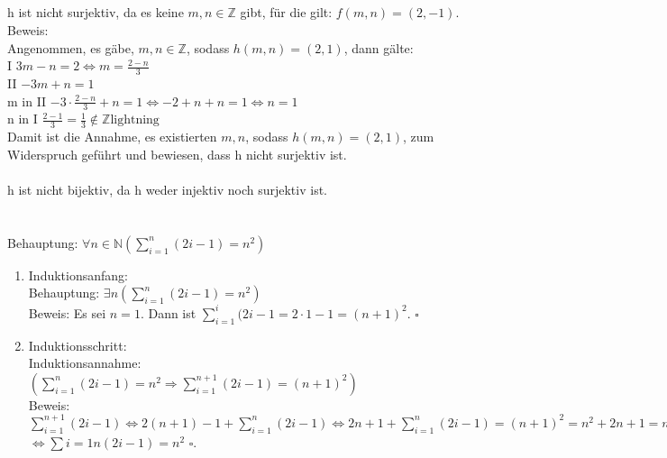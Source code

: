 \documentclass[fleqn]{article}
\newcommand{\N}{\mathbb{N}}
\newcommand{\Z}{\mathbb{Z}}
\begin{document}
\subsection{}
h ist nicht surjektiv, da es keine $m,n \in \Z$ gibt, für die gilt: $f(m,n) = (2,-1)$.\\
Beweis:\\
Angenommen, es gäbe, $m,n \in \Z$, sodass $h(m,n) = (2,1)$, dann gälte:\\
I   $3m - n = 2 \Leftrightarrow m = \frac{2-n}{3}$\\
II  $-3m + n = 1$\\
m in II  $-3 \cdot \frac{2-n}{3} + n = 1 \Leftrightarrow -2 + n + n = 1 \Leftrightarrow n = 1$\\
n in I  $\frac{2-1}{3} = \frac{1}{3} \notin \Z \text{lightning}$\\
Damit ist die Annahme, es existierten $m,n$, sodass $h(m,n) = (2,1)$, zum Widerspruch geführt und bewiesen, dass h nicht surjektiv ist.\\
\\
h ist nicht bijektiv, da h weder injektiv noch surjektiv ist.

\section{}
Behauptung: $\forall n \in \N (\sum\limits_{i=1}^{n} (2i-1) = n^2)$\\

\begin{enumerate}[I]
\item Induktionsanfang:\\
    Behauptung: $\exists n (\sum\limits_{i=1}^{n}(2i-1) = n^2)$\\
    Beweis: Es sei $n = 1$. Dann ist $\sum\limits_{i=1}^{i}(2i-1 = 2 \cdot 1 - 1 = (n+1)^2$. $\square$\\
\item Induktionsschritt:\\
    Induktionsannahme: $(\sum\limits_{i=1}^{n} (2i - 1) = n^2 \Rightarrow \sum\limits_{i = 1}^{n + 1}(2i-1) = (n+1)^2)$\\
    Beweis:\\
    $\sum\limits_{i=1}^{n+1}(2i-1) \Leftrightarrow 2(n+1) - 1 + \sum\limits_{i=1}^{n}(2i-1) \Leftrightarrow 2n + 1 + \sum\limits_{i=1}^{n}(2i-1) = (n+1)^2 = n^2 + 2n + 1 = n^2 + 2n + 1$\\
    $\Leftrightarrow \sum\limits{i=1}{n}(2i-1) = n^2$ $\square$.
\end{enumerate}
\end{document}
